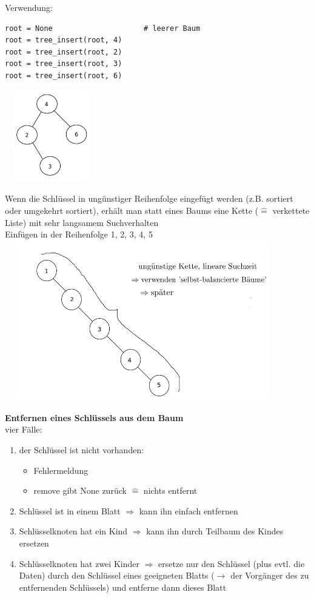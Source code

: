 \documentclass[11pt, fleqn]{scrreprt}
\begin{document}
Verwendung:
\begin{verbatim}
root = None                     # leerer Baum
root = tree_insert(root, 4)
root = tree_insert(root, 2)
root = tree_insert(root, 3)
root = tree_insert(root, 6)
\end{verbatim}

\includegraphics[width=4cm,height=4cm,keepaspectratio]{./Pictures/zahlenbaum.png}

Wenn die Schlüssel in ungünstiger Reihenfolge eingefügt werden (z.B. sortiert oder umgekehrt sortiert), erhält man statt eines Baums eine Kette ($\widehat{=}$ verkettete Liste) mit sehr langsamem Suchverhalten \\

Einfügen in der Reihenfolge 1, 2, 3, 4, 5 \\

\includegraphics[width=12cm,height=7cm,keepaspectratio]{./Pictures/Kette.png}

\textbf{Entfernen eines Schlüssels aus dem Baum}\\
vier Fälle:
\begin{enumerate}
    \item der Schlüssel ist nicht vorhanden:
    \begin{itemize}
        \item Fehlermeldung
        \item remove gibt None zurück $\widehat{=}$ nichts entfernt
    \end{itemize}
    \item Schlüssel ist in einem Blatt $\Rightarrow$ kann ihn einfach entfernen
    \item Schlüsselknoten hat ein Kind $\Rightarrow$ kann ihn durch Teilbaum des Kindes ersetzen
    \item Schlüsselknoten hat zwei Kinder $\Rightarrow$ ersetze nur den Schlüssel (plus evtl. die Daten) durch den Schlüssel eines geeigneten Blatts ($\rightarrow$ der Vorgänger des zu entfernenden Schlüssels)  und entferne dann dieses Blatt
\end{enumerate}
\end{document}
